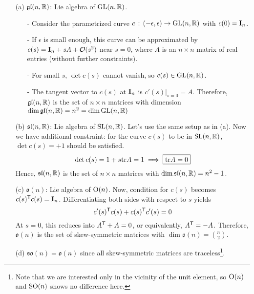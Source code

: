\documentclass[a4paper, 10pt]{article}
\begin{document}
\newpage


\begin{example}
    \hphantom{.}
    \begin{itemize}
        \item[(a)] $\mathfrak{gl}(n,\mathbb{R})$: Lie algebra of $\mathrm{GL}(n,\mathbb{R})$.
        \begin{itemize}
            \item[-] Consider the parametrized curve $c \,:\, (-\epsilon,\epsilon) \rightarrow \mathrm{GL}(n,\mathbb{R})$ with $c(0) = \mathbf{I}_{n}$.
            \item[-] If $\epsilon$ is small enough, this curve can be approximated by $c(s) = \mathbf{I}_{n} + sA + \mathcal{O}(s^{2})$ near $s = 0$, where $A$ is an $n \times n$ matrix of real entries (without further constraints).
            \item[-] For small $s$, $\det c(s)$ cannot vanish, so $c(s) \in \mathrm{GL}(n,\mathbb{R})$.
            \item[-] The tangent vector to $c(s)$ at $\mathbf{I}_{n}$ is $c'(s)|_{s=0}=A$. Therefore, $\mathfrak{gl}(n,\mathbb{R})$ is the set of $n \times n$ matrices with dimension $\dim \mathfrak{gl}(n,\mathbb{R}) = n^{2} = \dim \mathrm{GL}(n,\mathbb{R})$
        \end{itemize}
        \item[(b)] $\mathfrak{sl}(n,\mathbb{R})$: Lie algebra of $\mathrm{SL}(n,\mathbb{R})$. Let's use the same setup as in (a). Now we have additional constraint: for the curve $c(s)$ to be in $\mathrm{SL}(n,\mathbb{R})$, $\det c(s) = +1$ should be satisfied.
        \[ \det c(s) = 1 + s \mathrm{tr}A = 1 \;\Longrightarrow\; \boxed{\mathrm{tr}A = 0} \]
        Hence, $\mathfrak{sl}(n,\mathbb{R})$ is the set of $n \times n$  matrices with $\dim \mathfrak{sl}(n,\mathbb{R}) = n^{2} - 1$.
        \item[(c)] $\mathfrak{o}(n)$: Lie algebra of $\mathrm{O}(n)$. Now, condition for $c(s)$ becomes $c(s)^{\mathsf{T}}c(s) = \mathbf{I}_{n}$. Differentiating both sides with respect to $s$ yields
        \[ c'(s)^{\mathsf{T}}c(s) + c(s)^{\mathsf{T}}c'(s) = 0 \]
        At $s = 0$, this reduces into $A^{\mathsf{T}} + A = 0$, or equivalently, $A^{\mathsf{T}} = -A$. Therefore, $\mathfrak{o}(n)$ is the set of skew-symmetric matrices with $\dim \mathfrak{o}(n) = \binom{n}{2}$.
        \item[(d)] $\mathfrak{so}(n) = \mathfrak{o}(n)$ since all skew-symmetric matrices are traceless\footnote{Note that we are interested only in the vicinity of the unit element, so $\mathrm{O}(n)$ and $\mathrm{SO}(n)$ shows no difference here.}.

\end{itemize}
\end{example}
\end{document}
